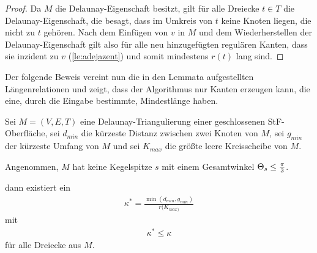 \begin{proof}
Da $M$ die Delaunay-Eigenschaft besitzt, gilt für alle Dreiecke $t\in T$ die Delaunay-Eigenschaft, die besagt, dass im Umkreis von $t$ keine Knoten liegen, die nicht zu $t$ gehören. Nach dem Einfügen von $v$ in $M$ und dem Wiederherstellen der Delaunay-Eigenschaft gilt also für alle neu hinzugefügten regulären Kanten, dass sie inzident zu $v$ (\ref{le:adejazent}) und somit mindestens $r(t)$ lang sind.
\end{proof}

\newpage
Der folgende Beweis vereint nun die in den Lemmata aufgestellten Längenrelationen und zeigt, dass der Algorithmus nur Kanten erzeugen kann, die eine, durch die Eingabe bestimmte, Mindestlänge haben.

\begin{lemma}
\label{lem:Obergrenze}
Sei $M = (V,E,T)$ eine Delaunay-Triangulierung   einer geschlossenen StF-Oberfläche, sei $d_{min}$ die kürzeste Distanz zwischen zwei Knoten von $M$, sei $g_{min}$ der kürzeste Umfang von $M$ und sei $K_{max}$ die größte leere Kreisscheibe von $M$.

Angenommen, $M$ hat keine Kegelspitze $s$ mit einem Gesamtwinkel $\gesamtwinkel*[s] \leq \frac{\pi}{3}$. 

dann  existiert ein 
\begin{align*}
    \kappa^* = \frac{\min(d_{min}, g_{min} )}{r(K_{max)}}
\end{align*}
mit 
\begin{align*}
 \kappa^* \leq \kappa   
\end{align*}
für alle Dreiecke aus $M$.




\end{lemma}



